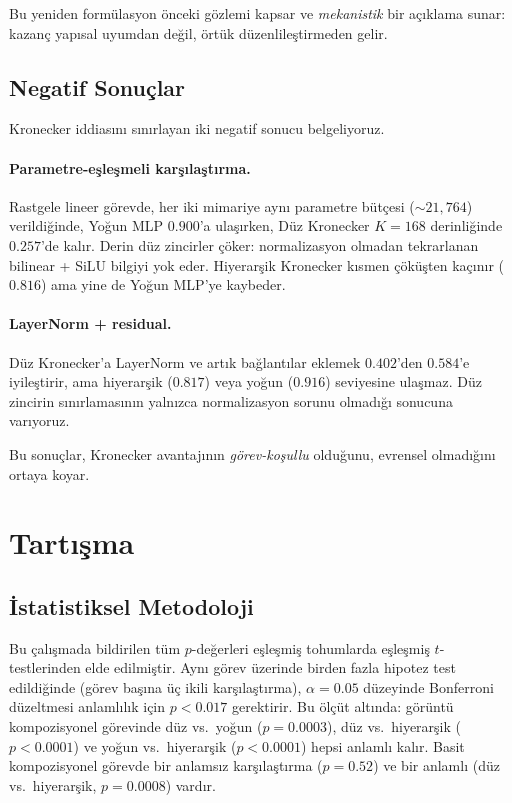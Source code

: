 \documentclass[11pt,a4paper]{article}
\begin{document}
Bu yeniden formülasyon önceki gözlemi kapsar ve \emph{mekanistik}
bir açıklama sunar: kazanç yapısal uyumdan değil, örtük
düzenlileştirmeden gelir.

\subsection{Negatif Sonuçlar}
\label{sec:negatives}

Kronecker iddiasını sınırlayan iki negatif sonucu belgeliyoruz.

\paragraph{Parametre-eşleşmeli karşılaştırma.}
Rastgele lineer görevde, her iki mimariye aynı parametre bütçesi
($\sim 21{,}764$) verildiğinde, Yoğun MLP $0.900$'a ulaşırken, Düz
Kronecker $K=168$ derinliğinde $0.257$'de kalır. Derin düz zincirler
çöker: normalizasyon olmadan tekrarlanan bilinear + SiLU bilgiyi yok eder.
Hiyerarşik Kronecker kısmen çöküşten kaçınır ($0.816$) ama yine de
Yoğun MLP'ye kaybeder.

\paragraph{LayerNorm + residual.}
Düz Kronecker'a LayerNorm ve artık bağlantılar eklemek $0.402$'den
$0.584$'e iyileştirir, ama hiyerarşik ($0.817$) veya yoğun ($0.916$)
seviyesine ulaşmaz. Düz zincirin sınırlamasının yalnızca normalizasyon
sorunu olmadığı sonucuna varıyoruz.

Bu sonuçlar, Kronecker avantajının \emph{görev-koşullu} olduğunu,
evrensel olmadığını ortaya koyar.


\section{Tartışma}
\label{sec:discussion}

\subsection{İstatistiksel Metodoloji}
\label{sec:stats}

Bu çalışmada bildirilen tüm $p$-değerleri eşleşmiş tohumlarda
eşleşmiş $t$-testlerinden elde edilmiştir. Aynı görev üzerinde birden
fazla hipotez test edildiğinde (görev başına üç ikili karşılaştırma),
$\alpha = 0.05$ düzeyinde Bonferroni düzeltmesi anlamlılık için
$p < 0.017$ gerektirir. Bu ölçüt altında: görüntü kompozisyonel
görevinde düz vs.\ yoğun ($p = 0.0003$), düz vs.\ hiyerarşik
($p < 0.0001$) ve yoğun vs.\ hiyerarşik ($p < 0.0001$) hepsi anlamlı
kalır. Basit kompozisyonel görevde bir anlamsız karşılaştırma
($p = 0.52$) ve bir anlamlı (düz vs.\ hiyerarşik, $p = 0.0008$) vardır.
\end{document}
